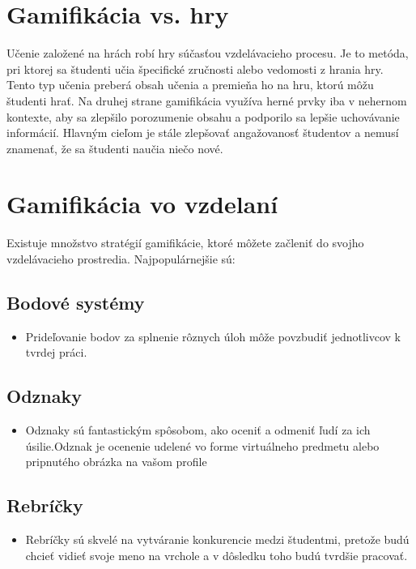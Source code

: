 \documentclass[10pt,twoside,slovak,a4paper]{article}
\begin{document}
\section{Gamifikácia vs. hry} 
Učenie založené na hrách robí hry súčasťou vzdelávacieho procesu.
Je to metóda, pri ktorej sa študenti učia špecifické zručnosti alebo vedomosti z hrania hry.
Tento typ učenia preberá obsah učenia a premieňa ho na hru, ktorú môžu študenti hrať.
Na druhej strane gamifikácia využíva herné prvky iba v nehernom kontexte, aby sa zlepšilo porozumenie obsahu a podporilo sa lepšie uchovávanie informácií.
Hlavným cieľom je stále zlepšovať angažovanosť študentov a nemusí znamenať, že sa študenti naučia niečo nové.


\section{Gamifikácia vo vzdelaní} 

Existuje množstvo stratégií gamifikácie, ktoré môžete začleniť do svojho vzdelávacieho prostredia.
Najpopulárnejšie sú: 
\subsection{Bodové systémy}
    \begin{itemize}
    \item Prideľovanie bodov za splnenie rôznych úloh môže povzbudiť    jednotlivcov k tvrdej práci.
    \end{itemize}

\subsection{Odznaky}
    
    \begin{itemize}
    \item  Odznaky sú fantastickým spôsobom, ako oceniť a odmeniť ľudí za ich úsilie.Odznak je ocenenie udelené vo forme virtuálneho predmetu alebo pripnutého obrázka na vašom profile
    \end{itemize}
 
\subsection{Rebríčky} 

    \begin{itemize}
    \item Rebríčky sú skvelé na vytváranie konkurencie medzi študentmi, pretože budú chcieť vidieť svoje meno na vrchole a v dôsledku toho budú tvrdšie pracovať.
    \end{itemize}
\end{document}
